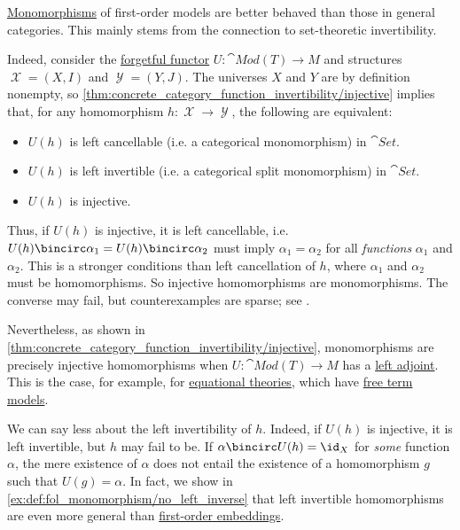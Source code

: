 \begin{remark}\label{rem:def:fol_monomorphism}
  \hyperref[def:fol_monomorphism]{Monomorphisms} of first-order models are better behaved than those in general categories. This mainly stems from the connection to set-theoretic invertibility.

  Indeed, consider the \hyperref[def:fol_theory_forgetful_functor/set]{forgetful functor} \( U: \cat{Mod}(T) \to M \) and structures \( \mscrX = (X, I) \) and \( \mscrY = (Y, J) \). The universes \( X \) and \( Y \) are by definition nonempty, so \cref{thm:concrete_category_function_invertibility/injective} implies that, for any homomorphism \( h: \mscrX \to \mscrY \), the following are equivalent:
  \begin{itemize}
    \item \( U(h) \) is left cancellable (i.e. a categorical monomorphism) in \( \cat{Set} \).

    \item \( U(h) \) is left invertible (i.e. a categorical split monomorphism) in \( \cat{Set} \).

    \item \( U(h) \) is injective.
  \end{itemize}

  Thus, if \( U(h) \) is injective, it is left cancellable, i.e. \( U(h) \bincirc \alpha_1 = U(h) \bincirc \alpha_2 \) must imply \( \alpha_1 = \alpha_2 \) for all \emph{functions} \( \alpha_1 \) and \( \alpha_2 \). This is a stronger conditions than left cancellation of \( h \), where \( \alpha_1 \) and \( \alpha_2 \) must be homomorphisms. So injective homomorphisms are monomorphisms. The converse may fail, but counterexamples are sparse; see \cite{MathSE:categories_where_monomorphisms_differ_from_injective_morphisms}.

  Nevertheless, as shown in \cref{thm:concrete_category_function_invertibility/injective}, monomorphisms are precisely injective homomorphisms when \( U: \cat{Mod}(T) \to M \) has a \hyperref[def:adjoint_functor]{left adjoint}. This is the case, for example, for \hyperref[def:fol_equational_theory]{equational theories}, which have \hyperref[def:fol_free_term_model]{free term models}.

  We can say less about the left invertibility of \( h \). Indeed, if \( U(h) \) is injective, it is left invertible, but \( h \) may fail to be. If \( \alpha \bincirc U(h) = \id_X \) for \emph{some} function \( \alpha \), the mere existence of \( \alpha \) does not entail the existence of a homomorphism \( g \) such that \( U(g) = \alpha \). In fact, we show in \cref{ex:def:fol_monomorphism/no_left_inverse} that left invertible homomorphisms are even more general than \hyperref[def:fol_monomorphism]{first-order embeddings}.
\end{remark}

